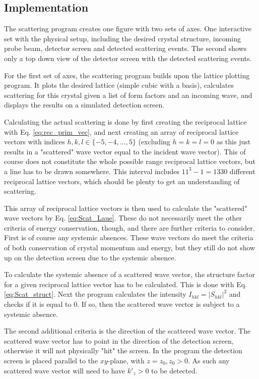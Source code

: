 \documentclass[main.tex]{subfiles}
\begin{document}
	\subsection{Implementation}	
	The scattering program creates one figure with two sets of axes. One interactive set with the physical setup, including the desired crystal structure, incoming probe beam, detector screen and detected scattering events. The second shows only a top down view of the detector screen with the detected scattering events.
	
	For the first set of axes, the scattering program builds upon the lattice plotting program. It plots the desired lattice (simple cubic with a basis), calculates scattering for this crystal given a list of form factors and an incoming wave, and displays the results on a simulated detection screen.
	
	Calculating the actual scattering is done by first creating the reciprocal lattice with Eq. \eqref{eq:rec_prim_vec}, and next creating an array of reciprocal lattice vectors with indices $ h,k,l \in \{-5, -4, \dots, 5\} $ (excluding $ h=k=l=0 $ as this just results in a "scattered" wave vector equal to the incident wave vector). This of course does not constitute the whole possible range reciprocal lattice vectors, but a line has to be drawn somewhere. This interval includes $ 11^3 - 1 = 1330$ different reciprocal lattice vectors, which should be plenty to get an understanding of scattering.
	
	This array of reciprocal lattice vectors is then used to calculate the "scattered" wave vectors by Eq. \eqref{eq:Scat_Laue}. These do not necessarily meet the other criteria of energy conservation, though, and there are further criteria to consider. First is of course any systemic absences. These wave vectors do meet the criteria of both conservation of crystal momentum and energy, but they still do not show up on the detection screen due to the systemic absence.
	
	To calculate the systemic absence of a scattered wave vector, the structure factor for a given reciprocal lattice vector has to be calculated. This is done with Eq. \eqref{eq:Scat_struct}. Next the program calculates the intensity $ I_{hkl}=|S_{hkl}|^2 $ and checks if it is equal to 0. If so, then the scattered wave vector is subject to a systemic absence.
	
	The second additional criteria is the direction of the scattered wave vector. The scattered wave vector has to point in the direction of the detection screen, otherwise it will not physically "hit" the screen. In the program the detection screen is placed parallel to the $ xy $-plane, with $ z=z_0, z_0 > 0 $. As such any scattered wave vector will need to have $ k'_z > 0 $ to be detected.
	
\end{document}
